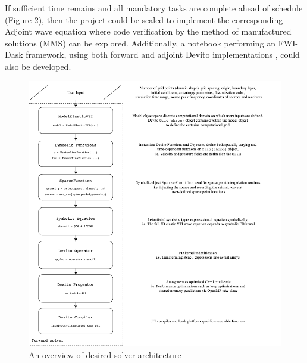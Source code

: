 If sufficient time remains and all mandatory tasks are complete ahead of schedule (Figure 2), then the project could be scaled to implement the corresponding Adjoint wave equation where code verification by the method of manufactured solutions (MMS) \cite{salari2000code, ober2009method} can be explored. Additionally, a notebook performing an FWI-Dask framework, using both forward and adjoint Devito implementations \cite{FWI_part3}, could also be developed. \\


\newpage
\begin{figure}[h!]
    \centering
    \includegraphics[width=1.0\textwidth]{project/Solver.png}
    \caption{An overview of desired solver architecture}
    \label{fig:solver}
\end{figure}

\newpage

